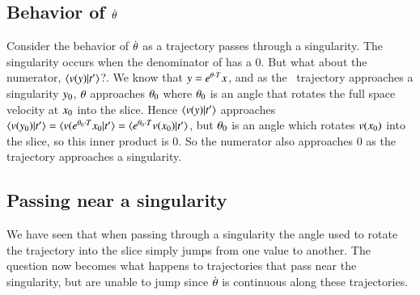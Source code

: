 \subsection{Behavior of $\dot{{\bf \theta}}$}

Consider the behavior of $\dot{{\bf \theta}}$ as a trajectory passes through a singularity. The singularity occurs when the denominator of  has a 0. But what about the numerator, $\braket{\vel(\sspRed)}{\sliceTan{}}$?. We know that $y=e^{{\bf \theta}\cdot T}x$, and as the \reducedsp\ trajectory approaches a singularity $y_0$, ${\bf \theta}$ approaches ${\bf \theta}_0$ where ${\bf \theta}_0$ is an angle that rotates the full space velocity at $x_0$ into the slice. Hence $\braket{\vel(\sspRed)}{\sliceTan{}}$ approaches $\braket{\vel(\sspRed_0)}{\sliceTan{}}
=\braket{\vel(e^{\gSpace_0\cdot\Lg}\ssp_0}{\sliceTan{}}
=\braket{e^{\gSpace_0\cdot\Lg}\vel(\ssp_0)}{\sliceTan{}}$,
but ${\bf \theta}_0$ is an angle which rotates $v(x_0)$ into the slice, so this inner product is 0. So the numerator also approaches 0 as the trajectory approaches a singularity.



\subsection{Passing near a singularity}

We have seen that when passing through a singularity the angle used to
rotate the trajectory into the slice simply jumps from one value to
another. The question now becomes what happens to trajectories that pass
near the singularity, but are unable to jump since $\dot{{\bf \theta}}$ is
continuous along these trajectories.

